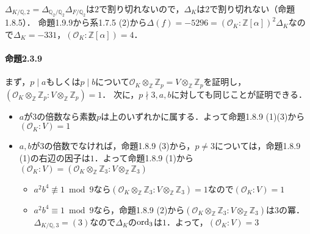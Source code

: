 $\varDelta_{K/\mathbb{Q}, 2}=\varDelta_{\mathbb{Q}_2/\mathbb{Q}_2}\varDelta_{F/\mathbb{Q}_2}$は$2$で割り切れないので，$\varDelta_{K}$は$2$で割り切れない（命題1.8.5）．
命題1.9.9から系1.7.5 (2)から$\varDelta(f)=-5296=(\mathcal{O}_K:\mathbb{Z}[\alpha])^2\varDelta_K$なので$\varDelta_K=-331$，$(\mathcal{O}_K:\mathbb{Z}[\alpha])=4$．

\paragraph{命題2.3.9}
まず，$p\mid a$もしくは$p\mid b$について$\mathcal{O}_K\otimes_\mathbb{Z}\mathbb{Z}_p= V\otimes_\mathbb{Z}\mathbb{Z}_p$を証明し，$(\mathcal{O}_K\otimes_\mathbb{Z}\mathbb{Z}_p:V\otimes_\mathbb{Z}\mathbb{Z}_p)=1$．
次に，$p\nmid 3, a, b$に対しても同じことが証明できる．

\begin{itemize}
  \item $a$が$3$の倍数なら素数$p$は上のいずれかに属する．よって命題1.8.9 (1)(3)から$(\mathcal{O}_K:V)=1$
  \item $a, b$が$3$の倍数でなければ，命題1.8.9 (3)から，$p\neq3$については，命題1.8.9 (1)の右辺の因子は$1$．よって命題1.8.9 (1)から$(\mathcal{O}_K:V)=(\mathcal{O}_K\otimes_\mathbb{Z}\mathbb{Z}_3:V\otimes_\mathbb{Z}\mathbb{Z}_3)$
  \begin{itemize}[label=•]
    \item $a^2b^4\not\equiv1\bmod9$なら$(\mathcal{O}_K\otimes_\mathbb{Z}\mathbb{Z}_3:V\otimes_\mathbb{Z}\mathbb{Z}_3)=1$なので$(\mathcal{O}_K:V)=1$
    \item $a^2b^4\equiv1\bmod9$なら，命題1.8.9 (2)から$(\mathcal{O}_K\otimes_\mathbb{Z}\mathbb{Z}_3:V\otimes_\mathbb{Z}\mathbb{Z}_3)$は$3$の冪．
    $\varDelta_{K/\mathbb{Q}, 3}=(3)$なので$\varDelta_K$の$\operatorname{ord}_3$は$1$．よって，$(\mathcal{O}_K:V)=3$
  \end{itemize}
\end{itemize}

